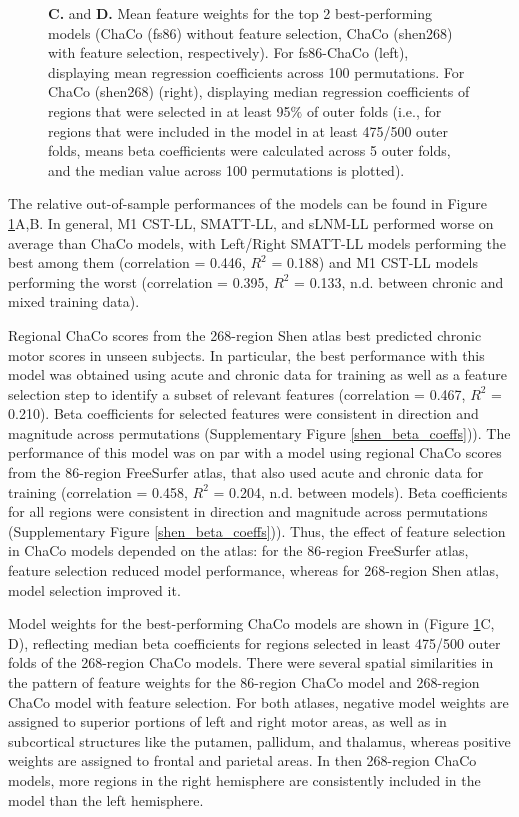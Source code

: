 \documentclass[10pt]{article}
\begin{document}
\begin{figure}[htp]
{\textbf{C.} and \textbf{D.} Mean feature weights for the top 2 best-performing models (ChaCo (fs86) without feature selection, ChaCo (shen268) with feature selection, respectively). For fs86-ChaCo (left), displaying mean regression coefficients across 100 permutations. For ChaCo (shen268) (right), displaying median regression coefficients of regions that were selected in at least 95$\%$ of outer folds (i.e., for regions that were included in the model in at least 475/500 outer folds, means beta coefficients were calculated across 5 outer folds, and the median value across 100 permutations is plotted). }
\label{analysis1}
\end{figure}

The relative out-of-sample performances of the models can be found in Figure \ref{analysis1}A,B. In general, M1 CST-LL, SMATT-LL, and sLNM-LL performed worse on average than ChaCo models, with Left/Right SMATT-LL models performing the best among them (correlation = 0.446, $R^2$ = 0.188) and M1 CST-LL models performing the worst (correlation = 0.395, $R^2$ = 0.133, n.d. between chronic and mixed training data). 

Regional ChaCo scores from the 268-region Shen atlas best predicted chronic motor scores in unseen subjects. In particular, the best performance with this model was obtained using acute and chronic data for training as well as a feature selection step to identify a subset of relevant features (correlation = 0.467, $R^2$ = 0.210). Beta coefficients for selected features were consistent in direction and magnitude across permutations (Supplementary Figure \ref{shen_beta_coeffs})). The performance of this model was on par with a model using regional ChaCo scores from the 86-region FreeSurfer atlas, that also used acute and chronic data for training (correlation = 0.458, $R^2$ = 0.204, n.d. between models). Beta coefficients for all regions were consistent in direction and magnitude across permutations (Supplementary Figure  \ref{shen_beta_coeffs})).  Thus, the effect of feature selection in ChaCo models depended on the atlas: for the 86-region FreeSurfer atlas, feature selection reduced model performance, whereas for 268-region Shen atlas, model selection improved it. 

Model weights for the best-performing ChaCo models are shown in (Figure \ref{analysis1}C, D), reflecting median beta coefficients for regions selected in least 475/500 outer folds of the 268-region ChaCo models. There were several spatial similarities in the pattern of feature weights for the 86-region ChaCo model and 268-region ChaCo model with feature selection. For both atlases, negative model weights are assigned to superior portions of left and right motor areas, as well as in subcortical structures like the putamen, pallidum, and thalamus, whereas positive weights are assigned to frontal and parietal areas. In then 268-region ChaCo models, more regions in the right hemisphere are consistently included in the model than the left hemisphere. 
\end{document}
